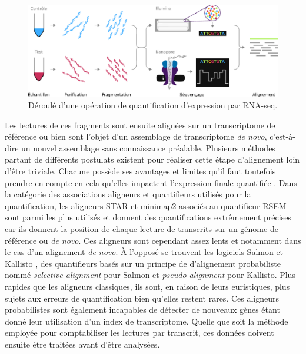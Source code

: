 \begin{figure}[hb]
    \centering
    \includegraphics[width=\textwidth]{img/intro/2_meth_transcripto/intro_2_rnaseq_workflpow.pdf}
    \caption{Déroulé d'une opération de quantification d'expression par RNA-seq.}
    \label{fig:intro_rnaseq_workflow}
\end{figure}

Les lectures de ces fragments sont ensuite alignées sur un transcriptome de référence ou bien sont l'objet d'un assemblage de transcriptome \textit{de novo}, c’est-à-dire un nouvel assemblage sans connaissance préalable. Plusieurs méthodes partant de différents postulats existent pour réaliser cette étape d'alignement loin d'être triviale. Chacune possède ses avantages et limites qu'il faut toutefois prendre en compte en cela qu'elles impactent l'expression finale quantifiée \cite{Yi2018Oct,Srivastava2020Dec}. Dans la catégorie des associations aligneurs et quantifieurs utilisés pour la quantification, les aligneurs STAR \cite{Dobin2013Jan} et minimap2 \cite{Li2018Sep} associés au quantifieur RSEM \cite{Li2011Dec} sont parmi les plus utilisés et donnent des quantifications extrêmement précises car ils donnent la position de chaque lecture de transcrits sur un génome de référence ou \textit{de novo}. Ces aligneurs sont cependant assez lents et notamment dans le cas d'un alignement \textit{de novo}. À l'opposé se trouvent les logiciels Salmon \cite{Patro2017Apr} et Kallisto \cite{Bray2016May}, des quantifieurs basés sur un principe de d'alignement probabiliste nommé \textit{selective-alignment} pour Salmon et \textit{pseudo-alignment} pour Kallisto. Plus rapides que les aligneurs classiques, ils sont, en raison de leurs euristiques, plus sujets aux erreurs de quantification bien qu'elles restent rares. Ces aligneurs probabilistes sont également incapables de détecter de nouveaux gènes étant donné leur utilisation d'un index de transcriptome. Quelle que soit la méthode employée pour comptabiliser les lectures par transcrit, ces données doivent ensuite être traitées avant d'être analysées.



